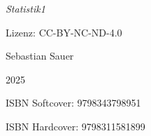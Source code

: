 \null\vfill
\begin{flushleft}
\thispagestyle{empty}
\textit{Statistik1}

Lizenz: CC-BY-NC-ND-4.0

Sebastian Sauer

2025

ISBN Softcover: 9798343798951

ISBN Hardcover: 9798311581899


\end{flushleft}
